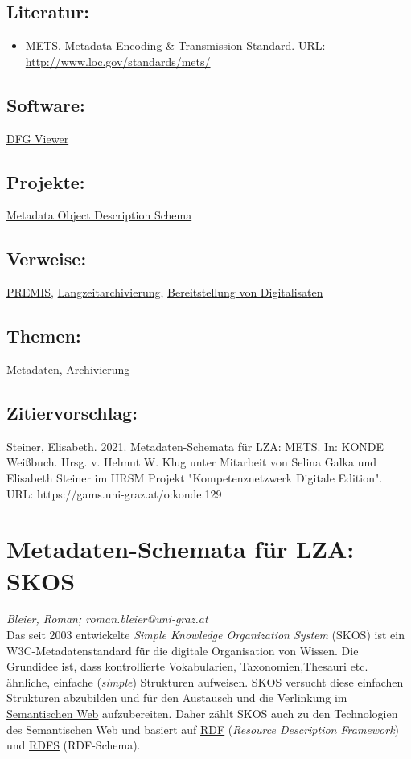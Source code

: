 \documentclass{article}
\begin{document}
        \subsection*{Literatur:}\begin{itemize}\item METS. Metadata Encoding & Transmission Standard. URL: \url{http://www.loc.gov/standards/mets/}\end{itemize}\subsection*{Software:}\href{https://dfg-viewer.de/}{DFG Viewer}\subsection*{Projekte:}\href{http://www.loc.gov/standards/mods/}{Metadata Object Description Schema}\subsection*{Verweise:}\href{https://gams.uni-graz.at/o:konde.130}{PREMIS}, \href{https://gams.uni-graz.at/o:konde.6}{Langzeitarchivierung}, \href{https://gams.uni-graz.at/o:konde.36}{Bereitstellung von Digitalisaten}\subsection*{Themen:}Metadaten, Archivierung\subsection*{Zitiervorschlag:}Steiner, Elisabeth. 2021. Metadaten-Schemata für LZA: METS. In: KONDE Weißbuch. Hrsg. v. Helmut W. Klug unter Mitarbeit von Selina Galka und Elisabeth Steiner im HRSM Projekt "Kompetenznetzwerk Digitale Edition". URL: https://gams.uni-graz.at/o:konde.129\newpage\section*{Metadaten-Schemata für LZA: SKOS} \emph{Bleier, Roman; roman.bleier@uni-graz.at }\\
        
    Das seit 2003 entwickelte \emph{Simple Knowledge Organization System
                  }(SKOS) ist ein W3C-Metadatenstandard für die digitale Organisation von
                  Wissen. Die Grundidee ist, dass kontrollierte Vokabularien, Taxonomien,Thesauri
                  etc. ähnliche, einfache (\emph{simple}) Strukturen aufweisen. SKOS
                  versucht diese einfachen Strukturen abzubilden und für den Austausch und die
                  Verlinkung im \href{http://gams.uni-graz.at/o:konde.167}{Semantischen Web}
                  aufzubereiten. Daher zählt SKOS auch zu den Technologien des Semantischen Web und
                  basiert auf \href{http://gams.uni-graz.at/o:konde.131}{RDF} (\emph{Resource Description Framework}) und \href{http://gams.uni-graz.at/o:konde.131}{RDFS} (RDF-Schema).\\
            
\end{document}

